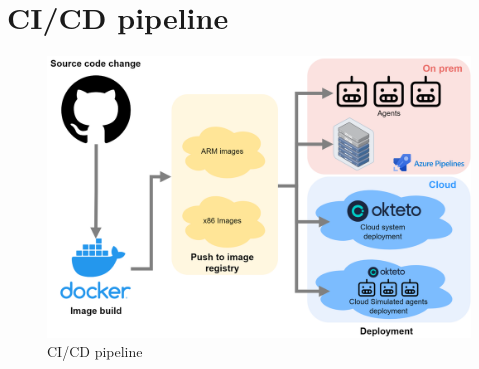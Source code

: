 \chapter{CI/CD pipeline}
\label{sec:app_07}

\begin{figure}[H]
    \centering
    \includegraphics[width=\textwidth]{pictures/cicd.png}
    \caption{CI/CD pipeline}
    \label{fig:cicd}
\end{figure}